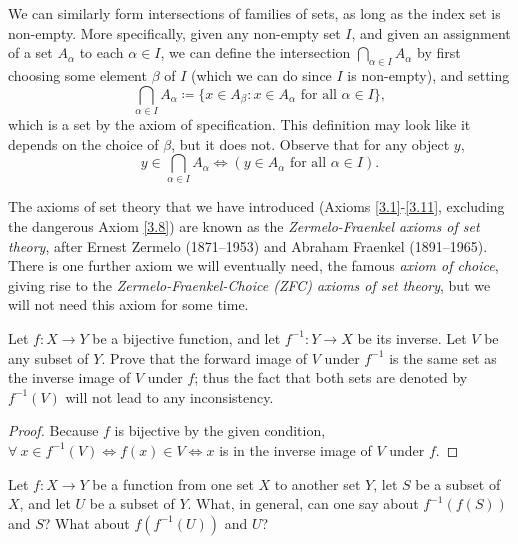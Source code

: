 \begin{note}
We can similarly form intersections of families of sets, as long as the index set is non-empty.
More specifically, given any non-empty set \(I\), and given an assignment of a set \(A_{\alpha}\) to each \(\alpha \in I\), we can define the intersection \(\bigcap_{\alpha \in I} A_{\alpha}\) by first choosing some element \(\beta\) of \(I\) (which we can do since \(I\) is non-empty), and setting
\[
    \bigcap_{\alpha \in I} A_{\alpha} \coloneqq \{x \in A_{\beta} : x \in A_{\alpha} \text{ for all } \alpha \in I\},
\]
which is a set by the axiom of specification.
This definition may look like it depends on the choice of \(\beta\), but it does not.
Observe that for any object \(y\),
\[
    y \in \bigcap_{\alpha \in I} A_{\alpha} \iff (y \in A_{\alpha} \text{ for all } \alpha \in I).
\]
\end{note}

\setcounter{theorem}{11}
\begin{remark}\label{3.4.12}
The axioms of set theory that we have introduced (Axioms \ref{3.1}-\ref{3.11}, excluding the dangerous Axiom \ref{3.8}) are known as the \emph{Zermelo-Fraenkel axioms of set theory}, after Ernest Zermelo (1871--1953) and Abraham Fraenkel (1891--1965).
There is one further axiom we will eventually need, the famous \emph{axiom of choice}, giving rise to the \emph{Zermelo-Fraenkel-Choice (ZFC) axioms of set theory}, but we will not need this axiom for some time.
\end{remark}

\exercisesection

\begin{exercise}\label{ex 3.4.1}
Let \(f : X \to Y\) be a bijective function, and let \(f^{-1} : Y \to X\) be its inverse.
Let \(V\) be any subset of \(Y\).
Prove that the forward image of \(V\) under \(f^{-1}\) is the same set as the inverse image of \(V\) under \(f\);
thus the fact that both sets are denoted by \(f^{-1}(V)\) will not lead to any inconsistency.
\end{exercise}

\begin{proof}
Because \(f\) is bijective by the given condition, \(\forall\ x \in f^{-1}(V) \iff f(x) \in V \iff x\) is in the inverse image of \(V\) under \(f\).
\end{proof}

\begin{exercise}\label{ex 3.4.2}
Let \(f : X \to Y\) be a function from one set \(X\) to another set \(Y\), let \(S\) be a subset of \(X\), and let \(U\) be a subset of \(Y\).
What, in general, can one say about \(f^{-1}(f(S))\) and \(S\)?
What about \(f(f^{-1}(U))\) and \(U\)?
\end{exercise}

